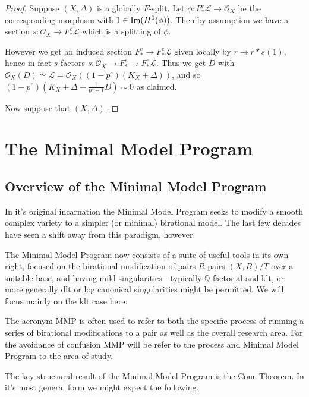 \documentclass[a4paper,12pt]{book}
\newcommand{\im}{\textup{Im}}
\newcommand{\ox}[1][X]{\mathcal{O}_{#1}}
\begin{document}
\begin{proof}
	Suppose $(X,\Delta)$ is a globally $F$-split. Let $\phi:F_{*}^{e}\mathcal{L} \to \ox$ be the corresponding morphism with $1 \in \im(H^{0}(\phi))$. Then by assumption we have a section $s:\ox \to F_{*}^{e}\mathcal{L}$ which is a splitting of $\phi$. 
	
	However we get an induced section $F_{*}^{e} \to F_{*}^{e}\mathcal{L}$ given locally by $r \to r*s(1)$, hence in fact $s$ factors $s: \ox \to F_{*}^{e} \to F_{*}^{e}\mathcal{L}$. Thus we get $D$ with $\ox(D) \simeq \mathcal{L}=\ox((1-p^{e})(K_{X}+\Delta))$, and so $(1-p^{e})(K_{X}+\Delta+\frac{1}{p^{e}-1}D) \sim 0$ as claimed.
	
	Now suppose that $(X,\Delta)$. 
	
	
\end{proof}

\section{The Minimal Model Program}

\subsection{Overview of the Minimal Model Program}\label{overview}
In it's original incarnation the Minimal Model Program seeks to modify a smooth complex variety to a simpler (or minimal) birational model. The last few decades have seen a shift away from this paradigm, however. 

The Minimal Model Program now consists of a suite of useful tools in its own right, focused on the birational modification of pairs $R$-pairs $(X,B)/T$ over a suitable base, and having mild singularities - typically $\mathbb{Q}$-factorial and klt, or more generally dlt or log canonical singularities might be permitted. We will focus mainly on the klt case here.

The acronym MMP is often used to refer to both the specific process of running a series of birational modifications to a pair as well as the overall research area. For the avoidance of confusion MMP will be refer to the process and Minimal Model Program to the area of study.

The key structural result of the Minimal Model Program is the Cone Theorem. In it's most general form we might expect the following.
\end{document}
